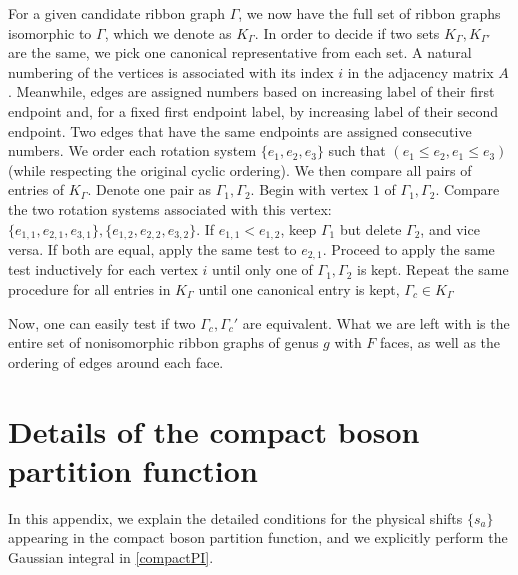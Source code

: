\documentclass[12pt]{article}
\numberwithin{equation}{section}
\begin{document}
For a given candidate ribbon graph $\Gamma$, we now have the full set of ribbon graphs isomorphic to $\Gamma$, which we denote as $K_\Gamma$. In order to decide if two sets $K_\Gamma,K_{\Gamma'}$ are the same, we pick one canonical representative from each set. A natural numbering of the vertices is associated with its index $i$ in the adjacency matrix $A$. Meanwhile, edges are assigned numbers based on increasing label of their first endpoint and, for a fixed first endpoint label, by increasing label of their second endpoint. Two edges that have the same endpoints are assigned consecutive numbers. We order each rotation system $\{e_1,e_2,e_3\}$ such that $(e_1 \leq e_2,e_1\leq e_3)$ (while respecting the original cyclic ordering). We then compare all pairs of entries of $K_\Gamma$. Denote one pair as $\Gamma_1,\Gamma_2$. Begin with vertex $1$ of $\Gamma_1,\Gamma_2$. Compare the two rotation systems associated with this vertex: $\{e_{1,1},e_{2,1},e_{3,1}\},\{e_{1,2},e_{2,2},e_{3,2}\}$. If $e_{1,1}< e_{1,2}$, keep $\Gamma_1$ but delete $\Gamma_2$, and vice versa. If both are equal, apply the same test to $e_{2,1}$. Proceed to apply the same test inductively for each vertex $i$ until only one of $\Gamma_1,\Gamma_2$ is kept. Repeat the same procedure for all entries in $K_\Gamma$ until one canonical entry is kept, $\Gamma_{c}\in K_\Gamma$

Now, one can easily test if two $\Gamma_c,\Gamma_{c}'$ are equivalent. What we are left with is the entire set of nonisomorphic ribbon graphs of genus $g$ with $F$ faces, as well as the ordering of edges around each face. %



\section{Details of the compact boson partition function}

\label{compactappendix}

In this appendix, we explain the detailed conditions for the physical shifts $\{s_a\}$ appearing in the compact boson partition function, and we explicitly perform the Gaussian integral in \eqref{compactPI}.
\end{document}
